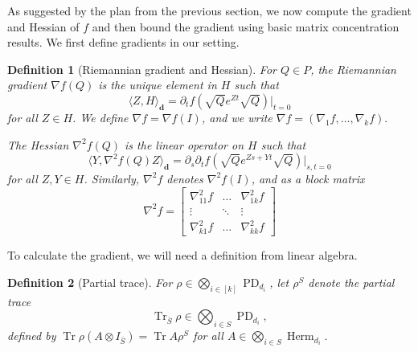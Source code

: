 \documentclass{article}
\newtheorem{definition}{Definition}
\renewcommand{\vec}{\bm}
\newcommand\PD{\operatorname{PD}}
\newcommand\Herm{\operatorname{Herm}}
\newcommand\tr{\operatorname{Tr}}
\begin{document}
As suggested by the plan from the previous section, we now compute the gradient and Hessian of $f$ and then bound the gradient using basic matrix concentration results. We first define gradients in our setting.
\begin{definition}[Riemannian gradient and Hessian]
For $Q \in P$, the Riemannian gradient $\nabla f(Q)$ is the unique element in $H$ such that
$$\langle Z, H \rangle_{\vec d} = \partial_t f(\sqrt{Q}e^{Zt}\sqrt{Q})|_{t = 0}$$
for all $Z \in H$. We define $\nabla f = \nabla f(I)$, and we write $\nabla f = (\nabla_1 f, \dots, \nabla_k f).$

The Hessian $\nabla^2 f(Q)$ is the linear operator on $H$ such that
$$\langle Y,  \nabla^2 f(Q) Z \rangle_{\vec d} = \partial_s \partial_t f(\sqrt{Q}e^{Zs + Yt}\sqrt{Q})|_{s,t = 0}$$
for all $Z, Y \in H$. Similarly, $\nabla^2 f$ denotes $\nabla^2 f(I)$, and as a block matrix
$$\nabla^2 f = \begin{bmatrix}
\nabla_{11}^2 f &  \dots &  \nabla^2_{1k} f \\
\vdots &  \ddots &  \vdots\\
 \nabla_{k1}^2 f &  \dots &  \nabla_{kk}^2 f
 \end{bmatrix}$$
\end{definition}
To calculate the gradient, we will need a definition from linear algebra.

\begin{definition}[Partial trace] For $\rho \in  \bigotimes_{i \in [k]} \PD_{d_i}$, let
$\rho^S$ denote the partial trace $$\tr_{\bar{S}} \rho \in \bigotimes_{i \in S} \PD_{d_i},$$
defined by $\tr \rho(A \otimes I_{\bar{S}}) = \tr A \rho^S$ for all $A \in \bigotimes_{i \in S} \Herm_{d_i}.$
\end{definition}
\end{document}
